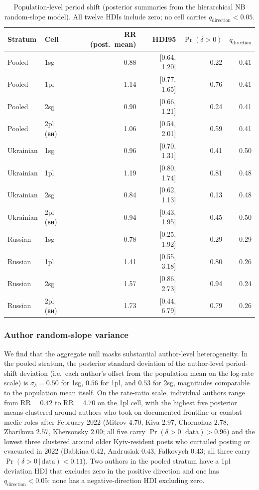 \documentclass[12pt]{interact}
\theoremstyle{plain}%
\theoremstyle{definition}
\theoremstyle{remark}
\begin{document}
\begin{table}[h]
\caption{Population-level period shift (posterior summaries from the hierarchical NB random-slope model). All twelve HDIs include zero; no cell carries $q_{\text{direction}} < 0.05$.}
\label{tab:rq2-pop}
\centering
\small
\begin{tabular}{llrrrr}
\toprule
Stratum & Cell & RR (post.\ mean) & HDI95 & $\Pr(\delta > 0)$ & $q_{\text{direction}}$ \\
\midrule
Pooled & 1sg & 0.88 & [0.64, 1.20] & 0.22 & 0.41 \\
Pooled & 1pl & 1.14 & [0.77, 1.65] & 0.76 & 0.41 \\
Pooled & 2sg & 0.90 & [0.66, 1.21] & 0.24 & 0.41 \\
Pooled & 2pl (\textukrainian{ви}) & 1.06 & [0.54, 2.01] & 0.59 & 0.41 \\
Ukrainian & 1sg & 0.96 & [0.70, 1.31] & 0.41 & 0.50 \\
Ukrainian & 1pl & 1.19 & [0.80, 1.74] & 0.81 & 0.48 \\
Ukrainian & 2sg & 0.84 & [0.62, 1.13] & 0.13 & 0.48 \\
Ukrainian & 2pl (\textukrainian{ви}) & 0.94 & [0.43, 1.95] & 0.45 & 0.50 \\
Russian & 1sg & 0.78 & [0.25, 1.92] & 0.29 & 0.29 \\
Russian & 1pl & 1.41 & [0.55, 3.18] & 0.80 & 0.26 \\
Russian & 2sg & 1.57 & [0.86, 2.73] & 0.94 & 0.24 \\
Russian & 2pl (\textukrainian{ви}) & 1.73 & [0.44, 6.79] & 0.79 & 0.26 \\
\bottomrule
\end{tabular}
\end{table}

\subsubsection{Author random-slope variance}

We find that the aggregate null masks substantial author-level heterogeneity. In the pooled stratum, the posterior standard deviation of the author-level period-shift deviation (i.e.\ each author's offset from the population mean on the log-rate scale) is $\sigma_{\delta} = 0.50$ for 1sg, $0.56$ for 1pl, and $0.53$ for 2sg, magnitudes comparable to the population mean itself. On the rate-ratio scale, individual authors range from $\mathrm{RR} = 0.42$ to $\mathrm{RR} = 4.70$ on the 1pl cell, with the highest five posterior means clustered around authors who took on documented frontline or combat-medic roles after February 2022 (Mitrov $4.70$, Kiva $2.97$, Chornohuz $2.78$, Zharikova $2.57$, Khersonsky $2.00$; all five carry $\Pr(\delta > 0\,|\,\text{data}) > 0.96$) and the lowest three clustered around older Kyiv-resident poets who curtailed posting or evacuated in 2022 (Babkina $0.42$, Andrusiak $0.43$, Falkovych $0.43$; all three carry $\Pr(\delta > 0\,|\,\text{data}) < 0.11$). Two authors in the pooled stratum have a 1pl deviation HDI that excludes zero in the positive direction and one has $q_{\text{direction}} < 0.05$; none has a negative-direction HDI excluding zero.
\end{document}
